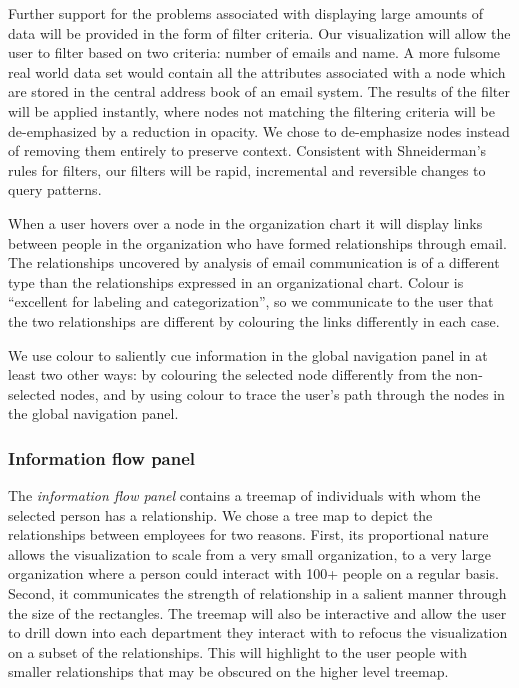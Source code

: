 \documentclass[12pt,letterpaper]{article}
\begin{document}
Further support for the problems associated with displaying large amounts of data will be provided in the form of filter criteria.  Our visualization will allow the user to filter based on two criteria: number of emails and name. A more fulsome real world data set would contain all the attributes associated with a node which are stored in the central address book of an email system.  The results of the filter will be applied instantly, where nodes not matching the filtering criteria will be de-emphasized by a reduction in opacity. We chose to de-emphasize nodes instead of removing them entirely to preserve context. Consistent with Shneiderman's rules for filters, our filters will be rapid, incremental and reversible changes to query patterns\cite{ahlberg1994visual}.

When a user hovers over a node in the organization chart it will display links between people in the organization who have formed relationships through email. The relationships uncovered by analysis of email communication is of a different type than the relationships expressed in an organizational chart. Colour is “excellent for labeling and categorization”\cite{ware2012information}, so we communicate to the user that the two relationships are different by colouring the links differently in each case.

We use colour to saliently cue\cite{ware2012information} information in the global navigation panel in at least two other ways: by colouring the selected node differently from the non-selected nodes, and by using colour to trace the user's path through the nodes in the global navigation panel. 

\subsubsection{Information flow panel}

The \emph{information flow panel} contains a treemap of individuals with whom the selected person has a relationship. We chose a tree map to depict the relationships between employees for two reasons. First, its proportional nature allows the visualization to scale from a very small organization, to a very large organization where a person could interact with 100+ people on a regular basis. Second, it communicates the strength of relationship in a salient manner through the size of the rectangles.  The treemap will also be interactive and allow the user to drill down into each department they interact with to refocus the visualization on a subset of the relationships.  This will highlight to the user people with smaller relationships that may be obscured on the higher level treemap.
\end{document}
